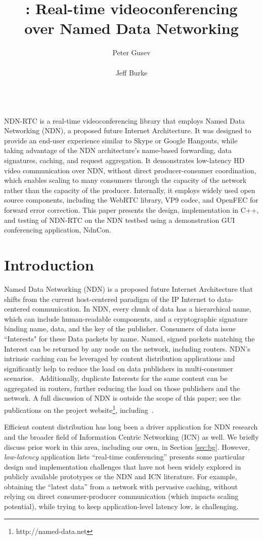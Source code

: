 \documentclass{icn/sig-alternate-2012} %
\title{\ndnrtcName{}: Real-time videoconferencing\\ over Named Data Networking}
\author{
\alignauthor Peter Gusev\\
       \affaddr{UCLA REMAP}\\
       \email{peter@remap.ucla.edu}
\alignauthor Jeff Burke\\
       \affaddr{UCLA REMAP}\\
       \email{jburke@remap.ucla.edu}
}
\newcommand{\ndnrtcName}{NDN-RTC} %
\newcommand{\ndnconName}{NdnCon}
\begin{document}
\maketitle

\abstract
\ndnrtcName{} is a real-time videoconferencing library that employs Named Data Networking (NDN), a proposed future Internet Architecture. It was designed to provide an end-user experience similar to Skype or Google Hangouts, while taking advantage of the NDN architecture's name-based forwarding, data signatures, caching, and request aggregation. It demonstrates low-latency HD video communication over NDN, without direct producer-consumer coordination, which enables scaling to many consumers through the capacity of the network rather than the capacity of the producer. Internally, it employs widely used open source components, including the WebRTC library, VP9 codec, and OpenFEC for forward error correction. This paper presents the design, implementation in C++, and testing of \ndnrtcName{} on the NDN testbed using a demonstration GUI conferencing application, \ndnconName{}.

\section{Introduction}
Named Data Networking (NDN) is a proposed future Internet Architecture that shifts from the current host-centered paradigm of the IP Internet to data-centered communication. In NDN, every chunk of data has a hierarchical name, which can include human-readable components, and a cryptographic signature binding name, data, and the key of the publisher.  Consumers of data issue ``Interests" for these Data packets by name.  Named, signed packets matching the Interest can be returned by any node on the network, including routers. NDN's intrinsic caching can be leveraged by content distribution applications and significantly help to reduce the load on data publishers in multi-consumer scenarios.~\cite{ndnvideo}  Additionally, duplicate Interests for the same content can be aggregated in routers, further reducing the load on those publishers and the network. A full discussion of NDN is outside the scope of this paper; see the publications on the project website\footnote{http://named-data.net}, including~\cite{ndntechreport}.

Efficient content distribution has long been a driver application for NDN research and the broader field of Information Centric Networking (ICN) as well.  We briefly discuss prior work in this area, including our own, in Section \ref{sec:bg}.  However, \emph{low-latency} application lists ``real-time conferencing'' presents some particular design and implementation challenges that have not been widely explored in publicly available prototypes or the NDN and ICN literature.   For example, obtaining the ``latest data'' from a network with pervasive caching, without relying on direct consumer-producer communication (which impacts scaling potential), while trying to keep application-level latency low, is challenging.
\end{document}
